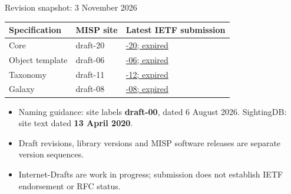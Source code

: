 \begin{frame}{Revision snapshot: 3 November 2026}
\small
\begin{tabular}{@{}p{3.1cm}p{2.1cm}p{4.5cm}@{}}
\toprule
\textbf{Specification} & \textbf{MISP site} & \textbf{Latest IETF submission} \\
\midrule
Core & draft-20 & \href{https://datatracker.ietf.org/doc/draft-dulaunoy-misp-core-format/}{-20; expired} \\
Object template & draft-06 & \href{https://datatracker.ietf.org/doc/draft-dulaunoy-misp-object-template-format/}{-06; expired} \\
Taxonomy & draft-11 & \href{https://datatracker.ietf.org/doc/draft-dulaunoy-misp-taxonomy-format/}{-12; expired} \\
Galaxy & draft-08 & \href{https://datatracker.ietf.org/doc/draft-dulaunoy-misp-galaxy-format/}{-08; expired} \\
\bottomrule
\end{tabular}
\medskip
\begin{itemize}
  \item Naming guidance: site labels \textbf{draft-00}, dated 6 August 2026. SightingDB: site text dated \textbf{13 April 2020}.
  \item Draft revisions, library versions and MISP software releases are separate version sequences.
  \item Internet-Drafts are work in progress; submission does not establish IETF endorsement or RFC status.
\end{itemize}
\end{frame}

